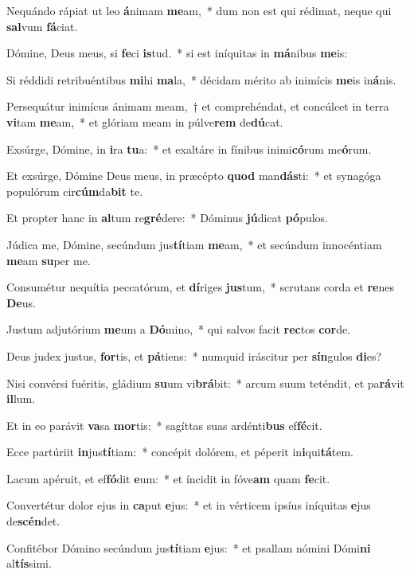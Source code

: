 \item Nequándo rápiat ut leo \textbf{á}nimam \textbf{me}am,~* dum non est qui rédimat, neque qui \textbf{sal}vum \textbf{fá}ciat.
\item Dómine, Deus meus, si \textbf{fe}ci \textbf{is}tud.~* si est iníquitas in \textbf{má}nibus \textbf{me}is:
\item Si réddidi retribuéntibus \textbf{mi}hi \textbf{ma}la,~* décidam mérito ab inimícis \textbf{me}is in\textbf{á}nis.
\item Persequátur inimícus ánimam meam,~† et comprehéndat, et concúlcet in terra \textbf{vi}tam \textbf{me}am,~* et glóriam meam in púlve\textbf{rem} de\textbf{dú}cat.
\item Exsúrge, Dómine, in \textbf{i}ra \textbf{tu}a:~* et exaltáre in fínibus inimi\textbf{có}rum me\textbf{ó}rum.
\item Et exsúrge, Dómine Deus meus, in præcépto \textbf{quod} man\textbf{dás}ti:~* et synagóga populórum cir\textbf{cúm}da\textbf{bit} te.
\item Et propter hanc in \textbf{al}tum re\textbf{gré}dere:~* Dóminus \textbf{jú}dicat \textbf{pó}pulos.
\item Júdica me, Dómine, secúndum jus\textbf{tí}tiam \textbf{me}am,~* et secúndum innocéntiam \textbf{me}am \textbf{su}per me.
\item Consumétur nequítia peccatórum, et \textbf{dí}riges \textbf{jus}tum,~* scrutans corda et \textbf{re}nes \textbf{De}us.
\item Justum adjutórium \textbf{me}um a \textbf{Dó}mino,~* qui salvos facit \textbf{rec}tos \textbf{cor}de.
\item Deus judex justus, \textbf{for}tis, et \textbf{pá}tiens:~* numquid iráscitur per \textbf{sín}gulos \textbf{di}es?
\item Nisi convérsi fuéritis, gládium \textbf{su}um vi\textbf{brá}bit:~* arcum suum teténdit, et pa\textbf{rá}vit \textbf{il}lum.
\item Et in eo parávit \textbf{va}sa \textbf{mor}tis:~* sagíttas suas ardénti\textbf{bus} ef\textbf{fé}cit.
\item Ecce partúriit \textbf{in}jus\textbf{tí}tiam:~* concépit dolórem, et péperit in\textbf{i}qui\textbf{tá}tem.
\item Lacum apéruit, et ef\textbf{fó}dit \textbf{e}um:~* et íncidit in fóve\textbf{am} quam \textbf{fe}cit.
\item Convertétur dolor ejus in \textbf{ca}put \textbf{e}jus:~* et in vérticem ipsíus iníquitas \textbf{e}jus de\textbf{scén}det.
\item Confitébor Dómino secúndum jus\textbf{tí}tiam \textbf{e}jus:~* et psallam nómini Dómi\textbf{ni} al\textbf{tís}simi.
